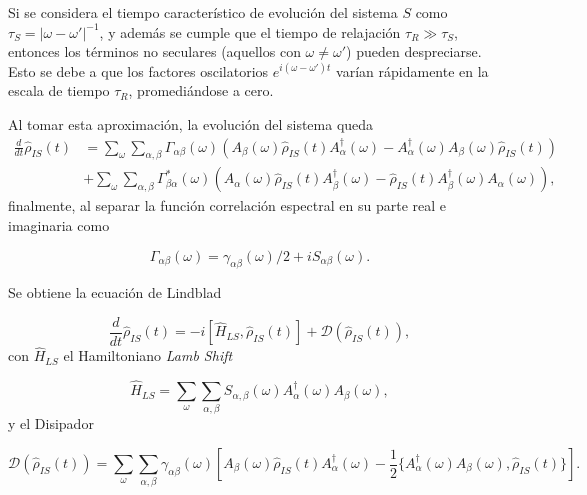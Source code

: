 Si se considera el tiempo característico de evolución del sistema $S$ como $\tau_S = |\omega - \omega'|^{-1}$, y además se cumple que el tiempo de relajación $\tau_R \gg \tau_S$, entonces los términos no seculares (aquellos con $\omega \neq \omega'$) pueden despreciarse. Esto se debe a que los factores oscilatorios $e^{i(\omega - \omega')t}$ varían rápidamente en la escala de tiempo $\tau_R$, promediándose a cero.

Al tomar esta aproximación, la evolución del sistema queda
\begin{align*}
    \frac{d}{dt}\hat{\rho}_{IS}(t) & = \sum_{\omega}\sum_{\alpha,\beta} \Gamma_{\alpha \beta}(\omega)\left(A_{\beta}(\omega)\hat{\rho}_{IS}(t)A^{\dagger}_{\alpha}(\omega) - A^{\dagger}_{\alpha}(\omega)A_{\beta}(\omega) \hat{\rho}_{IS}(t) \right) \\
    & + \sum_{\omega}\sum_{\alpha,\beta} \Gamma^{*}_{\beta \alpha}(\omega) \left(A_{\alpha}(\omega)\hat{\rho}_{IS}(t)A^{\dagger}_{\beta}(\omega) - \hat{\rho}_{IS}(t)A^{\dagger}_{\beta}(\omega)A_{\alpha}(\omega) \right),
\end{align*}
finalmente, al separar la función correlación espectral en su parte real e imaginaria como

\begin{equation*}
\Gamma_{\alpha \beta}(\omega) = \gamma_{\alpha \beta}(\omega)/2 + iS_{\alpha \beta}(\omega).
\end{equation*}

Se obtiene la ecuación de Lindblad 

\begin{equation}
    \frac{d}{dt} \hat{\rho}_{IS}(t) = -i[\hat{H}_{LS},\hat{\rho}_{IS}(t)] + \mathcal{D}(\hat{\rho}_{IS}(t)),
    \label{seclindbladfinal}
\end{equation}
con $\hat{H}_{LS}$ el Hamiltoniano \textit{Lamb Shift}

\begin{equation*}
    \hat{H}_{LS} = \sum_{\omega} \sum_{\alpha,\beta} S_{\alpha,\beta}(\omega)A^{\dagger}_{\alpha}(\omega)A_{\beta}(\omega), 
\end{equation*}
y el Disipador

\begin{equation*}
    \mathcal{D}(\hat{\rho}_{IS}(t)) = \sum_{\omega}\sum_{\alpha,\beta} \gamma_{\alpha \beta}(\omega) \left[ A_{\beta}(\omega)\hat{\rho}_{IS}(t)A^{\dagger}_{\alpha}(\omega) - \frac{1}{2}\{A^{\dagger}_{\alpha}(\omega)A_{\beta}(\omega), \hat{\rho}_{IS}(t)  \} \right].
\end{equation*}

